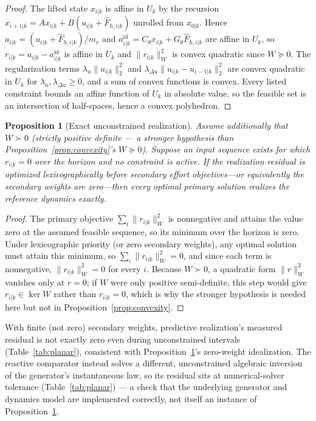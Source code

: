 \documentclass[journal]{IEEEtran}
\newtheorem{proposition}{Proposition}
\begin{document}
\begin{proof}
The lifted state $x_{i|k}$ is affine in $U_k$ by the recursion
$x_{i+1|k}=Ax_{i|k}+B(u_{i|k}+\hat F_{h,i|k})$ unrolled from $x_{0|k}$.
Hence $a_{i|k}=(u_{i|k}+\hat F_{h,i|k})/m_r$ and
$a_{i|k}^{\mathrm{id}}=C_\theta x_{i|k}+G_\theta\hat F_{h,i|k}$ are
affine in $U_k$, so $r_{i|k}=a_{i|k}-a_{i|k}^{\mathrm{id}}$ is affine in
$U_k$ and $\|r_{i|k}\|_W^2$ is convex quadratic since $W\succeq0$. The
regularization terms $\lambda_u\|u_{i|k}\|_2^2$ and
$\lambda_{\Delta u}\|u_{i|k}-u_{i-1|k}\|_2^2$ are convex quadratic in
$U_k$ for $\lambda_u,\lambda_{\Delta u}\ge0$, and a sum of convex
functions is convex. Every listed constraint bounds an affine function
of $U_k$ in absolute value, so the feasible set is an intersection of
half-spaces, hence a convex polyhedron.
\end{proof}

\begin{proposition}[Exact unconstrained realization]
\label{prop:exact}
Assume additionally that $W\succ0$ (strictly positive definite --- a
stronger hypothesis than Proposition~\ref{prop:convexity}'s
$W\succeq0$). Suppose an input sequence exists for which $r_{i|k}=0$
over the horizon and no constraint is active. If the realization
residual is optimized lexicographically before secondary effort
objectives---or equivalently the secondary weights are zero---then every
optimal primary solution realizes the reference dynamics exactly.
\end{proposition}

\begin{proof}
The primary objective $\sum_i\|r_{i|k}\|_W^2$ is nonnegative and attains
the value zero at the assumed feasible sequence, so its minimum over the
horizon is zero. Under lexicographic priority (or zero secondary
weights), any optimal solution must attain this minimum, so
$\sum_i\|r_{i|k}\|_W^2=0$, and since each term is nonnegative,
$\|r_{i|k}\|_W^2=0$ for every $i$. Because $W\succ0$, a quadratic form
$\|r\|_W^2$ vanishes only at $r=0$; if $W$ were only positive
semi-definite, this step would give $r_{i|k}\in\ker W$ rather than
$r_{i|k}=0$, which is why the stronger hypothesis is needed here but not
in Proposition~\ref{prop:convexity}.
\end{proof}

With finite (not zero) secondary weights, predictive realization's
measured residual is not exactly zero even during unconstrained
intervals (Table~\ref{tab:planar}), consistent with
Proposition~\ref{prop:exact}'s zero-weight idealization. The reactive
comparator instead solves a different, unconstrained algebraic
inversion of the generator's instantaneous law, so its residual sits at
numerical-solver tolerance (Table~\ref{tab:planar}) --- a check that the
underlying generator and dynamics model are implemented correctly, not
itself an instance of Proposition~\ref{prop:exact}.
\end{document}
